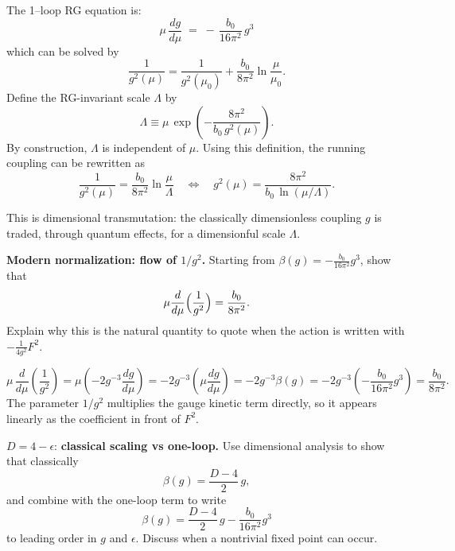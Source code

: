 \begin{solution}
	The 1--loop RG equation is:
	\[
	\mu\,\frac{dg}{d\mu} \;=\; -\,\frac{b_0}{16\pi^2}\,g^3 
	\]
	which can be solved by
	\[
	\frac{1}{g^2(\mu)}=\frac{1}{g^2(\mu_0)}+\frac{b_0}{8\pi^2}\ln\frac{\mu}{\mu_0}.
	\]
	Define the RG-invariant scale \(\Lambda\) by
	\[
	\Lambda \equiv \mu\,\exp\!\left(-\frac{8\pi^2}{b_0\,g^2(\mu)}\right).
	\]
	By construction, \(\Lambda\) is independent of \(\mu\). Using this definition, the running coupling can be rewritten as
	\[
	\frac{1}{g^2(\mu)}=\frac{b_0}{8\pi^2}\ln\frac{\mu}{\Lambda}
	\quad\Longleftrightarrow\quad
	\boxed{g^2(\mu)=\frac{8\pi^2}{b_0\,\ln(\mu/\Lambda)}}.
	\]
	
	This is dimensional transmutation: the classically dimensionless coupling \(g\) is traded, through quantum effects, for a dimensionful scale \(\Lambda\).
\end{solution}
\begin{problem}
    \textbf{Modern normalization: flow of \(1/g^2\).} Starting from \(\beta(g)=-\frac{b_0}{16\pi^2}g^3\), show that
    \[
        \mu\frac{d}{d\mu}\Bigl(\frac{1}{g^2}\Bigr)=\frac{b_0}{8\pi^2}.
    \]
    Explain why this is the natural quantity to quote when the action is written with \(-\frac{1}{4g^2}F^2\).
\end{problem}
\begin{solution}[31.5]
	\[
	\mu\,\frac{d}{d\mu}\!\left(\frac{1}{g^2}\right)
	=\mu\left(-2g^{-3}\frac{dg}{d\mu}\right)
	=-2g^{-3}\left(\mu\frac{dg}{d\mu}\right)
	=-2g^{-3}\beta(g)
	=-2g^{-3}\left(-\frac{b_0}{16\pi^2}g^3\right)
	=\frac{b_0}{8\pi^2}.
	\]
	The parameter \(1/g^2\) multiplies the gauge kinetic term directly, so it appears linearly as the coefficient in front of \(F^2\).
\end{solution}
\begin{problem}
    \(D=4-\epsilon\): \textbf{classical scaling vs one-loop.} Use dimensional analysis to show that classically
    \[
        \beta(g)=\frac{D-4}{2}\,g,
    \]
    and combine with the one-loop term to write
    \[
        \beta(g)=\frac{D-4}{2}\,g-\frac{b_0}{16\pi^2}g^3
    \]
    to leading order in \(g\) and \(\epsilon\). Discuss when a nontrivial fixed point can occur.
\end{problem}
